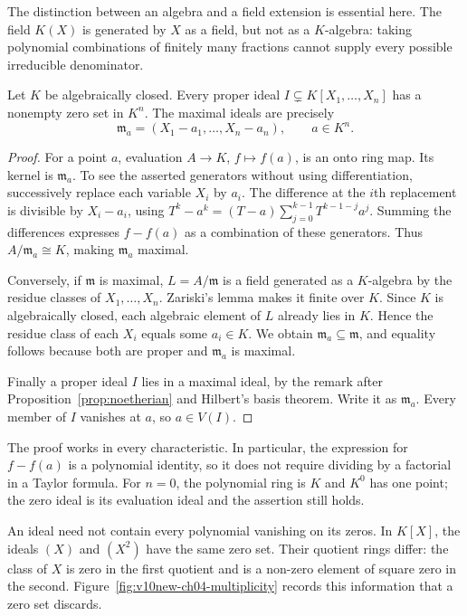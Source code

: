 The distinction between an algebra and a field extension is essential here. The field $K(X)$ is generated by $X$ as a field, but not as a $K$-algebra: taking polynomial combinations of finitely many fractions cannot supply every possible irreducible denominator.

\begin{theorem}\label{thm:weaknull}
Let $K$ be algebraically closed. Every proper ideal $I\subsetneq K[X_1,\ldots,X_n]$ has a nonempty zero set in $K^n$. The maximal ideals are precisely
\[
\mathfrak m_a=(X_1-a_1,\ldots,X_n-a_n),\qquad a\in K^n.
\]
\end{theorem}

\begin{proof}
For a point $a$, evaluation $A\to K$, $f\mapsto f(a)$, is an onto ring map. Its kernel is $\mathfrak m_a$. To see the asserted generators without using differentiation, successively replace each variable $X_i$ by $a_i$. The difference at the $i$th replacement is divisible by $X_i-a_i$, using $T^k-a^k=(T-a)\sum_{j=0}^{k-1}T^{k-1-j}a^j$. Summing the differences expresses $f-f(a)$ as a combination of these generators. Thus $A/\mathfrak m_a\cong K$, making $\mathfrak m_a$ maximal.

Conversely, if $\mathfrak m$ is maximal, $L=A/\mathfrak m$ is a field generated as a $K$-algebra by the residue classes of $X_1,\ldots,X_n$. Zariski's lemma makes it finite over $K$. Since $K$ is algebraically closed, each algebraic element of $L$ already lies in $K$. Hence the residue class of each $X_i$ equals some $a_i\in K$. We obtain $\mathfrak m_a\subseteq\mathfrak m$, and equality follows because both are proper and $\mathfrak m_a$ is maximal.

Finally a proper ideal $I$ lies in a maximal ideal, by the remark after Proposition~\ref{prop:noetherian} and Hilbert's basis theorem. Write it as $\mathfrak m_a$. Every member of $I$ vanishes at $a$, so $a\in V(I)$.
\end{proof}

The proof works in every characteristic. In particular, the expression for $f-f(a)$ is a polynomial identity, so it does not require dividing by a factorial in a Taylor formula. For $n=0$, the polynomial ring is $K$ and $K^0$ has one point; the zero ideal is its evaluation ideal and the assertion still holds.

An ideal need not contain every polynomial vanishing on its zeros. In $K[X]$, the ideals $(X)$ and $(X^2)$ have the same zero set. Their quotient rings differ: the class of $X$ is zero in the first quotient and is a non-zero element of square zero in the second. Figure~\ref{fig:v10new-ch04-multiplicity} records this information that a zero set discards.

